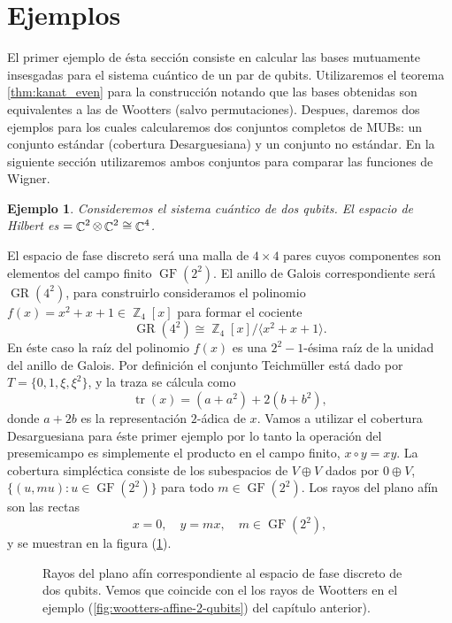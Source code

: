 \documentclass[a4paper,11pt]{report}
\DeclareMathOperator{\C}{\mathbb{C}}
\DeclareMathOperator{\Z}{\mathbb{Z}}
\let\H\relax
\DeclareMathOperator{\H}{\mathcal H}
\DeclareMathOperator{\tr}{tr}
\DeclareMathOperator{\GF}{GF}
\DeclareMathOperator{\GR}{GR}
\newtheorem{example}{Ejemplo}
\begin{document}
  \section{Ejemplos}

  El primer ejemplo de ésta sección consiste en calcular las
  bases mutuamente insesgadas para el sistema cuántico de un
  par de qubits. Utilizaremos el teorema
  \ref{thm:kanat_even} para la construcción notando que las
  bases obtenidas son equivalentes a las de Wootters (salvo
  permutaciones).  Despues, daremos dos ejemplos para los
  cuales calcularemos dos conjuntos completos de MUBs: un
  conjunto estándar (cobertura Desarguesiana) y un conjunto
  no estándar. En la siguiente sección utilizaremos ambos
  conjuntos para comparar las funciones de Wigner.

  \begin{example}
    Consideremos el sistema cuántico de dos qubits. El
    espacio de Hilbert es $\H = \C^2 \otimes \C^2 \cong
    \C^{4}$. 
  \end{example}
  El espacio de fase discreto será una malla de
  $4 \times 4$ pares cuyos componentes son elementos del
  campo finito $\GF(2^2)$. El anillo de Galois
  correspondiente será $\GR(4^{2})$, para construirlo
  consideramos el polinomio $f(x) = x^2+x+1 \in \Z_4[x]$
  para formar el cociente
  \[
    \GR(4^2) \cong \Z_4[x] / \langle x^2+x+1 \rangle.
  \] 
  En éste caso la raíz del polinomio $f(x)$ es una
  $2^{2}-1$-ésima raíz de la unidad del anillo de Galois.
  Por definición el conjunto Teichmüller está dado por $T =
  \{0,1,\xi,\xi^2\}$, y la traza se cálcula como
  \[
    \tr(x) = (a + a^2) + 2(b + b^2),
  \] 
  donde $a + 2b$ es la representación $2$-ádica de $x$.
  Vamos a utilizar el cobertura Desarguesiana para éste
  primer ejemplo por lo tanto la operación del presemicampo
  es simplemente el producto en el campo finito, $x \circ y
  = xy$. La cobertura simpléctica consiste de los
  subespacios de $V \oplus V$ dados por $0 \oplus V$, $\{(u,
  mu) : u \in \GF(2^2)\}$ para todo $m \in \GF(2^2)$.  Los
  rayos del plano afín son las rectas
  \[
    x = 0,
    \quad
    y = mx, \quad m \in \GF(2^2),
  \] 
  y se muestran en la figura (\ref{fig:2-2-desargues-plane}).
  \begin{figure}[ht]
    \centering
    \scalebox{0.8}{
      
    }
    \caption{Rayos del plano afín correspondiente al espacio
    de fase discreto de dos qubits. Vemos que coincide con
    el los rayos de Wootters en el ejemplo
    (\ref{fig:wootters-affine-2-qubits}) del capítulo
    anterior).}
    \label{fig:2-2-desargues-plane}
  \end{figure}
\end{document}
